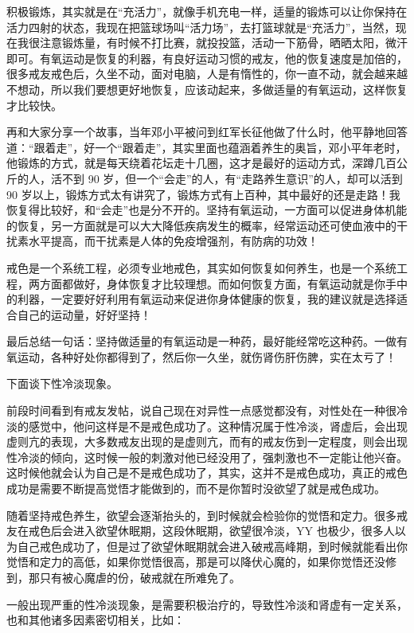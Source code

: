 \documentclass{ctexart}
\begin{document}
积极锻炼，其实就是在“充活力”，就像手机充电一样，适量的锻炼可以让你保持在活力四射的状态，我现在把篮球场叫“活力场”，去打篮球就是“充活力”，当然，现在我很注意锻炼量，有时候不打比赛，就投投篮，活动一下筋骨，晒晒太阳，微汗即可。有氧运动是恢复的利器，有良好运动习惯的戒友，他的恢复速度是加倍的，很多戒友戒色后，久坐不动，面对电脑，人是有惰性的，你一直不动，就会越来越不想动，所以我们要想更好地恢复，应该动起来，多做适量的有氧运动，这样恢复才比较快。

再和大家分享一个故事，当年邓小平被问到红军长征他做了什么时，他平静地回答道：“跟着走”，好一个“跟着走”，其实里面也蕴涵着养生的奥旨，邓小平年老时，他锻炼的方式，就是每天绕着花坛走十几圈，这才是最好的运动方式，深蹲几百公斤的人，活不到 90 岁，但一个“会走”的人，有“走路养生意识”的人，却可以活到 90 岁以上，锻炼方式太有讲究了，锻炼方式有上百种，其中最好的还是走路！我恢复得比较好，和“会走”也是分不开的。坚持有氧运动，一方面可以促进身体机能的恢复，另一方面就是可以大大降低疾病发生的概率，经常运动还可使血液中的干扰素水平提高，而干扰素是人体的免疫增强剂，有防病的功效！

戒色是一个系统工程，必须专业地戒色，其实如何恢复如何养生，也是一个系统工程，两方面都做好，身体恢复才比较理想。而如何恢复方面，有氧运动就是你手中的利器，一定要好好利用有氧运动来促进你身体健康的恢复，我的建议就是选择适合自己的运动量，好好坚持！

最后总结一句话：坚持做适量的有氧运动是一种药，最好能经常吃这种药。一做有氧运动，各种好处你都得到了，然后你一久坐，就伤肾伤肝伤脾，实在太亏了！

下面谈下性冷淡现象。

前段时间看到有戒友发帖，说自己现在对异性一点感觉都没有，对性处在一种很冷淡的感觉中，他问这样是不是戒色成功了。这种情况属于性冷淡，肾虚后，会出现虚则亢的表现，大多数戒友出现的是虚则亢，而有的戒友伤到一定程度，则会出现性冷淡的倾向，这时候一般的刺激对他已经没用了，强刺激也不一定能让他兴奋。这时候他就会认为自己是不是戒色成功了，其实，这并不是戒色成功，真正的戒色成功是需要不断提高觉悟才能做到的，而不是你暂时没欲望了就是戒色成功。

随着坚持戒色养生，欲望会逐渐抬头的，到时候就会检验你的觉悟和定力。很多戒友在戒色后会进入欲望休眠期，这段休眠期，欲望很冷淡，YY 也极少，很多人以为自己戒色成功了，但是过了欲望休眠期就会进入破戒高峰期，到时候就能看出你觉悟和定力的高低，如果你觉悟很高，那是可以降伏心魔的，如果你觉悟还没修到，那只有被心魔虐的份，破戒就在所难免了。

一般出现严重的性冷淡现象，是需要积极治疗的，导致性冷淡和肾虚有一定关系，也和其他诸多因素密切相关，比如：
\end{document}
